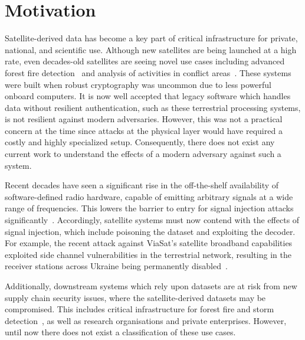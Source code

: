 \section{Motivation}

Satellite-derived data has become a key part of critical infrastructure for private, national, and scientific use.
Although new satellites are being launched at a high rate, even decades-old satellites are seeing novel use cases including advanced forest fire detection~\cite{nasaFirms} and analysis of activities in conflict areas~\cite{separatistLuminosity}. %
These systems were built when robust cryptography was uncommon due to less powerful onboard computers.
It is now well accepted that legacy software which handles data without resilient authentication, such as these terrestrial processing systems, is not resilient against modern adversaries.
However, this was not a practical concern at the time since attacks at the physical layer would have required a costly and highly specialized setup.
Consequently, there does not exist any current work to understand the effects of a modern adversary against such a system.

Recent decades have seen a significant rise in the off-the-shelf availability of software-defined radio hardware, capable of emitting arbitrary signals at a wide range of frequencies.
This lowers the barrier to entry for signal injection attacks significantly~\cite{manulis2021cyber}. %
Accordingly, satellite systems must now contend with the effects of signal injection, which include poisoning the dataset and exploiting the decoder.
For example, the recent attack against ViaSat's satellite broadband capabilities exploited side channel vulnerabilities in the terrestrial network, resulting in the receiver stations across Ukraine being permanently disabled~\cite{satcomAnalysis}.

Additionally, downstream systems which rely upon datasets are at risk from new supply chain security issues, where the satellite-derived datasets may be compromised.
This includes critical infrastructure for forest fire and storm detection~\cite{nasaFirms,sarikhani2021new}, as well as research organisations and private enterprises.
However, until now there does not exist a classification of these use cases.

